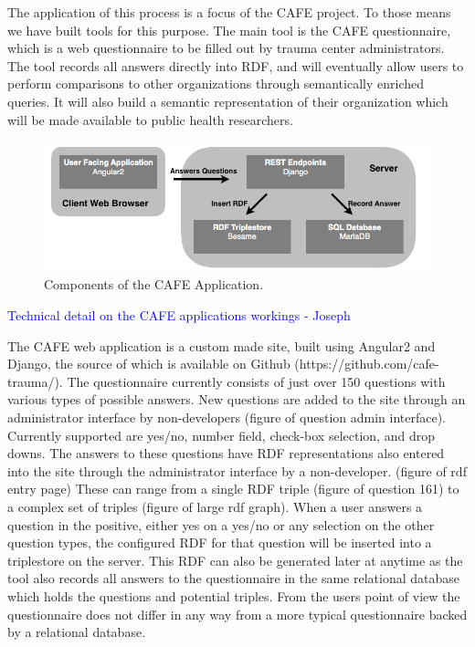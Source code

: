 \documentclass{amia}
\begin{document}
The application of this process is a focus of the CAFE project.
To those means we have built tools for this purpose.
The main tool is the CAFE questionnaire, which is a web questionnaire to be filled out by trauma center administrators.
The tool records all answers directly into RDF, and will eventually allow users to perform comparisons to other organizations through semantically enriched queries.
It will also build a semantic representation of their organization which will be made available to public health researchers.

\begin{figure}[h!]
  \centering
  \includegraphics[width=1\textwidth]{pics/cafe_process.png}
  \caption{Components of the CAFE Application.}
  \label{cafe_process}
\end{figure}

\textcolor{blue}{Technical detail on the CAFE applications workings - Joseph}

The CAFE web application is a custom made site, built using Angular2 and Django, the source of which is available on Github (https://github.com/cafe-trauma/).
The questionnaire currently consists of just over 150 questions with various types of possible answers.
New questions are added to the site through an administrator interface by non-developers (figure of question admin interface).
Currently supported are yes/no, number field, check-box selection, and drop downs.
The answers to these questions have RDF representations also entered into the site through the administrator interface by a non-developer. (figure of rdf entry page)
These can range from a single RDF triple (figure of question 161) to a complex set of triples (figure of large rdf graph).
When a user answers a question in the positive, either yes on a yes/no or any selection on the other question types, the configured RDF for that question will be inserted into a triplestore on the server.
This RDF can also be generated later at anytime as the tool also records all answers to the questionnaire in the same relational database which holds the questions and potential triples.
From the users point of view the questionnaire does not differ in any way from a more typical questionnaire backed by a relational database.
\end{document}
